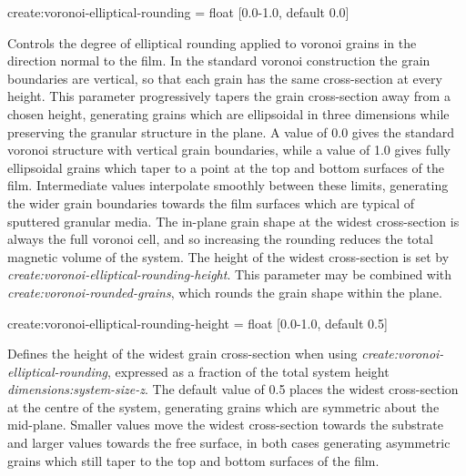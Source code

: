 {\zicf create:voronoi-elliptical-rounding = float [0.0-1.0, default 0.0]}
Controls the degree of elliptical rounding applied to voronoi grains in the direction normal
to the film. In the standard voronoi construction the grain boundaries are vertical, so that
each grain has the same cross-section at every height. This parameter progressively tapers the
grain cross-section away from a chosen height, generating grains which are ellipsoidal in three
dimensions while preserving the granular structure in the plane. A value of 0.0 gives the
standard voronoi structure with vertical grain boundaries, while a value of 1.0 gives fully
ellipsoidal grains which taper to a point at the top and bottom surfaces of the film.
Intermediate values interpolate smoothly between these limits, generating the wider grain
boundaries towards the film surfaces which are typical of sputtered granular media. The
in-plane grain shape at the widest cross-section is always the full voronoi cell, and so
increasing the rounding reduces the total magnetic volume of the system. The height of the
widest cross-section is set by \textit{create:voronoi-elliptical-rounding-height}. This
parameter may be combined with \textit{create:voronoi-rounded-grains}, which rounds the grain
shape within the plane.

{\zicf create:voronoi-elliptical-rounding-height = float [0.0-1.0, default 0.5]}
Defines the height of the widest grain cross-section when using
\textit{create:voronoi-elliptical-rounding}, expressed as a fraction of the total system height
\textit{dimensions:system-size-z}. The default value of 0.5 places the widest cross-section at
the centre of the system, generating grains which are symmetric about the mid-plane. Smaller
values move the widest cross-section towards the substrate and larger values towards the free
surface, in both cases generating asymmetric grains which still taper to the top and bottom
surfaces of the film.

